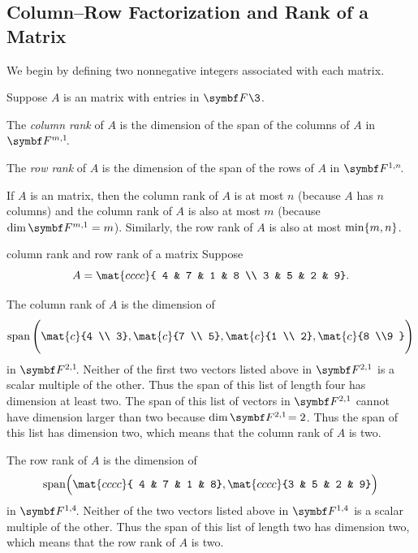 \subsection{Column--Row Factorization and Rank of a Matrix}

We begin by defining two nonnegative integers associated with each matrix.

{Suppose $A$ is an  matrix with entries in $\F{}\3$.
\begin{Itemize}
\item
The \emph{column rank} of $A$ is the dimension of the span of the columns of $A$ in~$\FF{m,1}$.
\item
The \emph{row rank} of $A$ is the dimension of the span of the rows of $A$ in $\FF{1, n}$.
\end{Itemize}}

If $A$ is an  matrix, then the column rank of $A$ is at most $n$ (because $A$ has $n$ columns) and the column rank of $A$ is also at most $m$ (because $\dim \F{m,1} = m$). Similarly, the row rank of $A$ is also at most $\min \{m,n\}$.

\begin{example}[rowcolrank]{column rank and row rank of a\/  matrix}
Suppose
\vspace{-.06in} %
\[
A = \mat{cccc}{
4 & 7 & 1 & 8 \\
3 & 5 & 2 & 9}.
\]

The column rank of $A$ is the dimension of
\[
\Span \left( \rule{0bp}{18.5bp} \mat{c}{4 \\ 3}, \mat{c}{7 \\ 5}, \mat{c}{1 \\ 2}, \mat{c}{8 \\9 } \right)
\vspace{-.01in} %
\]
in $\FF{2,1}$. Neither of the first two vectors listed above in $\F{2,1}$ is a scalar multiple of the other. Thus the span of this list of length four has dimension at least two. The span of this list of vectors in $\F{2,1}$ cannot have dimension larger than two because $\dim \FF{2,1} = 2$. Thus the span of this list has dimension two, which means that the column rank of $A$ is two.

The row rank of $A$ is the dimension of
\[
\Span \Bigl( \mat{cccc}{
4 & 7 & 1 & 8}, \mat{cccc}{3 & 5 & 2 & 9} \Bigr)
\vspace{-.01in} %
\]
in $\FF{1, 4}$. Neither of the two vectors listed above in $\F{1, 4}$ is a scalar multiple of the other. Thus the span of this list of length two has dimension two, which means that the row rank of $A$ is two.
\end{example}

